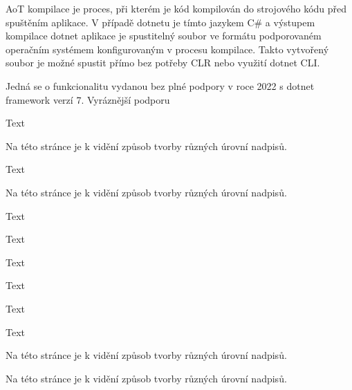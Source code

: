 AoT kompilace je proces, při kterém je kód kompilován do strojového kódu před spuštěním aplikace. V případě dotnetu je tímto jazykem C\# a výstupem kompilace dotnet aplikace je spustitelný soubor ve formátu podporovaném operačním systémem konfigurovaným v procesu kompilace. Takto vytvořený soubor je možné spustit přímo bez potřeby CLR nebo využití dotnet CLI. 

Jedná se o funkcionalitu vydanou bez plné podpory v roce 2022 s dotnet framework verzí 7. Vyráznější podporu\cite{aot}

Text


Na této stránce je k vidění způsob tvorby různých úrovní nadpisů.

Text










Na této stránce je k vidění způsob tvorby různých úrovní nadpisů.

Text

Text

Text

Text

Text

Text




Na této stránce je k vidění způsob tvorby různých úrovní nadpisů.





Na této stránce je k vidění způsob tvorby různých úrovní nadpisů.

